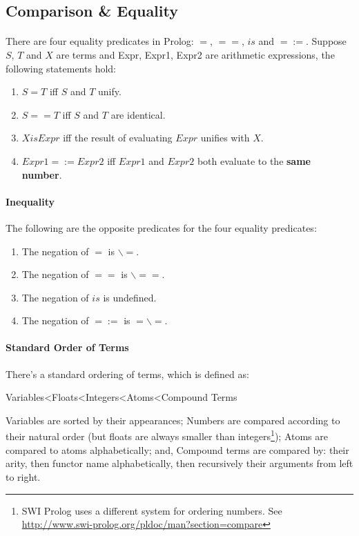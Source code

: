 \documentclass{article}
\begin{document}
\begin{multicols}{2}
  \section{Comparison \& Equality}
  
  \paragraph{} There are four equality predicates in Prolog: $=$, $==$, $is$ and $=:=$. Suppose $S$, $T$ and $X$ are terms and Expr, Expr1, Expr2 are arithmetic expressions, the following statements hold:
  
  \begin{enumerate}
  \item $S = T$ iff $S$ and $T$ unify.
  \item $S == T$ iff $S$ and $T$ are identical.
  \item $X is Expr$ iff the result of evaluating $Expr$ unifies with $X$.
  \item $Expr1 =:= Expr2$ iff $Expr1$ and $Expr2$ both evaluate to the {\bf same number}.
  \end{enumerate}
  
  \paragraph{Inequality} The following are the opposite predicates for the four equality predicates:
  
  \begin{enumerate}
  \item The negation of $=$ is $\backslash=$.
  \item The negation of $==$ is $\backslash==$.
  \item The negation of $is$ is undefined.
  \item The negation of $=:=$ is $=\backslash=$.
  \end{enumerate}
  
  \paragraph{Standard Order of Terms} There's a standard ordering of terms, which is defined as:
  
  \noindent \small Variables\textless Floats\textless Integers\textless Atoms\textless Compound Terms
  
  Variables are sorted by their appearances; Numbers are compared according to their natural order (but floats are always smaller than integers\footnote{SWI Prolog uses a different system for ordering numbers. See \href{http://www.swi-prolog.org/pldoc/man?section=compare}{http://www.swi-prolog.org/pldoc/man?section=compare}}); Atoms are compared to atoms alphabetically; and, Compound terms are compared by: their arity, then functor name alphabetically, then recursively their arguments from left to right. 
  

\end{multicols}
\end{document}
